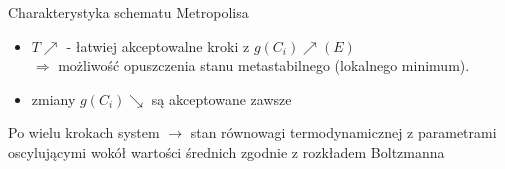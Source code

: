		\begin{frame}{Charakterystyka schematu Metropolisa}
		\begin{itemize}
			\item $T \nearrow$ - łatwiej akceptowalne kroki z $g(C_i) \nearrow (E)$ \\ $ \Rightarrow$ możliwość opuszczenia stanu metastabilnego (lokalnego minimum).
			\item zmiany $g(C_i) \searrow$ są akceptowane zawsze
		\end{itemize}
		
		Po wielu krokach system $\rightarrow$ stan równowagi termodynamicznej z parametrami oscylującymi wokół wartości średnich zgodnie z rozkładem Boltzmanna 
		

	\end{frame}

		
		
